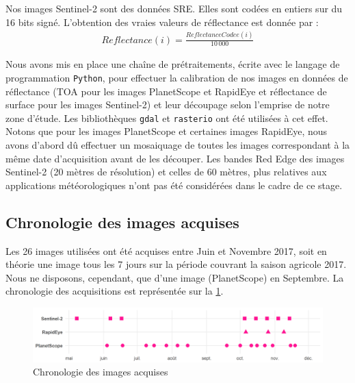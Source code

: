 \vspace{5mm}

Nos images Sentinel-2 sont des données SRE. Elles sont codées en entiers sur du 16 bits signé. L'obtention des vraies valeurs de réflectance est donnée par :
\begin{align}
  Reflectance (i) =  \frac{ReflectanceCodee(i)}{10\,000}
\end{align}

\vspace{5mm}
 
Nous avons mis en place une chaîne de prétraitements, écrite avec le langage de programmation \texttt{Python}, pour effectuer la calibration de nos images en données de 
réflectance (TOA pour les images PlanetScope et RapidEye et réflectance de surface pour les images Sentinel-2) et leur découpage selon l'emprise de notre zone d'étude. 
Les bibliothèques \texttt{gdal} et \texttt{rasterio} ont été utilisées à cet effet. Notons que pour les images PlanetScope et certaines images RapidEye, nous avons d'abord dû 
effectuer un mosaiquage de toutes les images correspondant à la même date d'acquisition avant de les découper. Les bandes Red Edge des images Sentinel-2 (20 mètres 
de résolution) et celles de 60 mètres, plus relatives aux applications météorologiques n'ont pas été considérées dans le cadre de ce stage.

  \subsection{Chronologie des images acquises}
  
Les 26 images utilisées ont été acquises entre Juin et Novembre 2017, soit en théorie une image tous les 7 jours sur la période couvrant la saison agricole 2017. Nous ne disposons, cependant, que d'une image (PlanetScope) en Septembre. La chronologie des acquisitions est représentée sur la \cref{fig-Chronologie}.

\begin{figure}[htbp]
 \begin{center}
  \includegraphics[scale=0.7]{materiels_methodes/chronologie.png} 
 \end{center}
 \caption{Chronologie des images acquises}
  \label{fig-Chronologie}
\end{figure}

